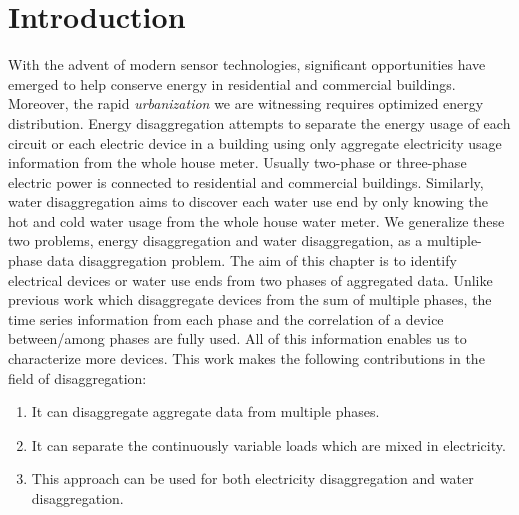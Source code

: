 \section{Introduction}
With the advent of modern sensor technologies, 
significant opportunities have emerged to help conserve energy in 
residential and commercial buildings. Moreover, the rapid \emph{urbanization} we are witnessing requires optimized energy distribution. 
Energy disaggregation attempts to 
separate the energy usage 
of each circuit or each electric device in a building 
using only aggregate electricity usage information from 
the whole house meter. 
Usually two-phase or three-phase electric power is 
connected to residential and commercial buildings. 
Similarly, water disaggregation aims to discover each 
water use end by only knowing the 
hot and cold water usage from the whole house water meter.
We generalize these two problems, energy disaggregation and 
water disaggregation, as a multiple-phase data disaggregation problem. 
The aim of this chapter is to identify electrical devices or water use ends from 
two phases of aggregated data. 
Unlike previous work which disaggregate devices
from the sum of multiple phases, 
the time series information from each phase and the correlation of a device between/among phases 
are fully used.  
All of this information enables us to characterize more devices. 
This work makes the following contributions in the field of disaggregation:
\begin{enumerate}
\item It can disaggregate aggregate data from multiple phases.
\item It can separate the continuously variable loads which are mixed in electricity. 
\item This approach can be used for both electricity disaggregation and water disaggregation.
\end{enumerate}


